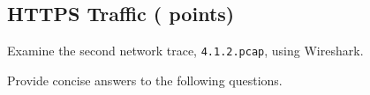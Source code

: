 \newpage

\subsection{HTTPS Traffic ( points)}
\label{sec:cp1.2}
Examine the second network trace, \texttt{4.1.2.pcap}, using Wireshark.

\medskip

Provide concise answers to the following questions.

\newcommand{\fileyear}{\ref*{sec:cp1.2}.\ref*{itm:year}.txt}
\newcommand{\filedomain}{\ref*{sec:cp1.2}.\ref*{itm:domain}.txt}
\newcommand{\filecslist}{\ref*{sec:cp1.2}.\ref*{itm:cslist}.txt}
\newcommand{\fileservercs}{\ref*{sec:cp1.2}.\ref*{itm:servercs}.txt}
\newcommand{\filename}{\ref*{sec:cp1.2}.\ref*{itm:name}.txt}
\newcommand{\filemsg}{\ref*{sec:cp1.2}.\ref*{itm:msg}.txt}
\newcommand{\filecookie}{\ref*{sec:cp1.2}.\ref*{itm:cookie}.txt}


